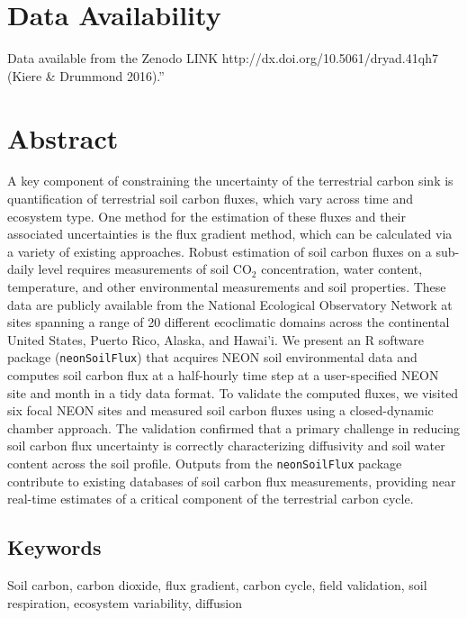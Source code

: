\documentclass[
  letterpaper,
  DIV=11,
  numbers=noendperiod]{scrartcl}
\begin{document}
\section*{Data Availability}\label{data-availability}

Data available from the Zenodo LINK
http://dx.doi.org/10.5061/dryad.41qh7 (Kiere \& Drummond 2016).''

\newpage

\section{Abstract}\label{abstract}

A key component of constraining the uncertainty of the terrestrial
carbon sink is quantification of terrestrial soil carbon fluxes, which
vary across time and ecosystem type. One method for the estimation of
these fluxes and their associated uncertainties is the flux gradient
method, which can be calculated via a variety of existing approaches.
Robust estimation of soil carbon fluxes on a sub-daily level requires
measurements of soil CO\(_{2}\) concentration, water content,
temperature, and other environmental measurements and soil properties.
These data are publicly available from the National Ecological
Observatory Network at sites spanning a range of 20 different
ecoclimatic domains across the continental United States, Puerto Rico,
Alaska, and Hawai'i. We present an R software package
(\texttt{neonSoilFlux}) that acquires NEON soil environmental data and
computes soil carbon flux at a half-hourly time step at a user-specified
NEON site and month in a tidy data format. To validate the computed
fluxes, we visited six focal NEON sites and measured soil carbon fluxes
using a closed-dynamic chamber approach. The validation confirmed that a
primary challenge in reducing soil carbon flux uncertainty is correctly
characterizing diffusivity and soil water content across the soil
profile. Outputs from the \texttt{neonSoilFlux} package contribute to
existing databases of soil carbon flux measurements, providing near
real-time estimates of a critical component of the terrestrial carbon
cycle.

\subsection{Keywords}\label{keywords}

Soil carbon, carbon dioxide, flux gradient, carbon cycle, field
validation, soil respiration, ecosystem variability, diffusion
\end{document}
